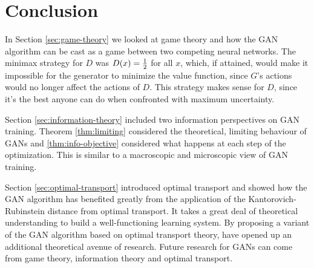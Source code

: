 \section{Conclusion}

In Section \ref{sec:game-theory} we looked at game theory and how the
GAN algorithm can be cast as a game between two competing neural
networks.  The minimax strategy for $D$ was $D(x) = {1 \over 2}$ for
all $x$, which, if attained, would make it impossible for the
generator to minimize the value function, since $G$'s actions would no
longer affect the actions of $D$.  This strategy makes sense for $D$,
since it's the best anyone can do when confronted with maximum
uncertainty.

Section \ref{sec:information-theory} included two information
perspectives on GAN training. Theorem \ref{thm:limiting} considered
the theoretical, limiting behaviour of GANs and
\ref{thm:info-objective} considered what happens at each step of the
optimization.  This is similar to a macroscopic and microscopic view
of GAN training.

Section \ref{sec:optimal-transport} introduced optimal transport and
showed how the GAN algorithm has benefited greatly from the
application of the Kantorovich-Rubinstein distance from optimal
transport.  It takes a great deal of theoretical understanding to
build a well-functioning learning system.  By proposing a variant of
the GAN algorithm based on optimal transport theory,
\cite{ref:arjovsky-2017} have opened up an additional theoretical
avenue of research.  Future research for GANs can come from game
theory, information theory and optimal transport.


